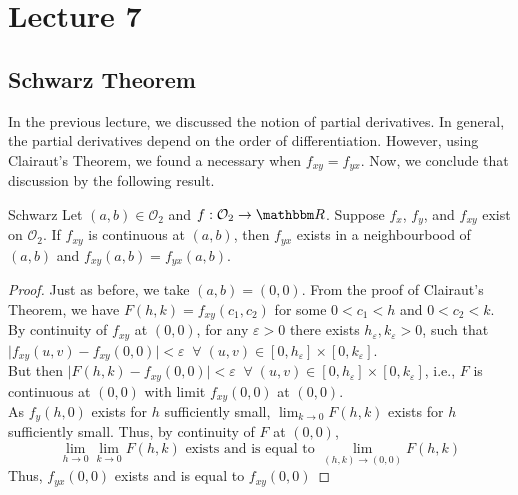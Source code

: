 \documentclass[../Analysis-3]{subfiles}
\begin{document}
\chapter*{Lecture 7} %
\setcounter{chapter}{7} %



\section{Schwarz Theorem}

In the previous lecture, we discussed the notion of partial derivatives. In general, the partial derivatives depend on the order of differentiation. However, using Clairaut's Theorem, we found a necessary when $f_{xy} = f_{yx}$. Now, we conclude that discussion by the following result.

\begin{Thm}{Schwarz}{}\label{thm1:7}
  Let $(a,b) \in \mathcal{O}_2$ and $f:\mathcal{O}_2 \to \R$. Suppose $f_x$, $f_y$, and $f_{xy}$ exist on $\mathcal{O}_2$. If $f_{xy}$ is continuous at $(a,b)$, then $f_{yx}$ exists in a neighbourbood of $(a,b)$ and $f_{xy}(a,b) = f_{yx}(a,b)$.
\end{Thm}

\begin{proof}
  Just as before, we take $(a,b) = (0,0)$. From the proof of Clairaut's Theorem, we have $F(h,k) = f_{xy}(c_1, c_2)$ for some $0 < c_1< h$ and $0 < c_2 < k$. By continuity of $f_{xy}$ at $(0,0)$, for any $\varepsilon >0$ there exists $h_\varepsilon, k_\varepsilon > 0$, such that $\mid f_{xy}(u,v)- f_{xy}(0,0)\mid < \varepsilon \;\;\forall \; (u,v) \in [0,h_\varepsilon]\times[0,k_\varepsilon]$. \\
  But then $\mid F(h,k) - f_{xy}(0,0) \mid < \varepsilon \;\;\forall \; (u,v) \in [0,h_\varepsilon]\times[0,k_\varepsilon]$, i.e., $F$ is continuous at $(0,0)$ with limit $f_{xy}(0,0)$ at $(0,0)$.\\
  As $f_y(h,0)$ exists for $h$ sufficiently small, $\lim_{k \to 0} F(h,k)$ exists for $h$ sufficiently small. Thus, by continuity of $F$ at $(0,0)$,
  \[\lim_{h \to 0}\lim_{k \to 0} F(h,k) \text{  exists and is equal to  }\lim_{(h,k) \to (0,0)} F(h,k)\]
  Thus, $f_{yx}(0,0)$ exists and is equal to $f_{xy}(0,0)$
\end{proof}

\vspace{.2 cm}
\end{document}
